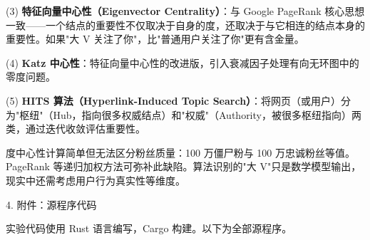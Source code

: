 \noindent\hspace*{2em}(3) \textbf{特征向量中心性（Eigenvector Centrality）}：与 Google PageRank 核心思想一致——一个结点的重要性不仅取决于自身的度，还取决于与它相连的结点本身的重要性。如果"大 V 关注了你"，比"普通用户关注了你"更有含金量。\par
\noindent\hspace*{2em}(4) \textbf{Katz 中心性}：特征向量中心性的改进版，引入衰减因子处理有向无环图中的零度问题。\par
\noindent\hspace*{2em}(5) \textbf{HITS 算法（Hyperlink-Induced Topic Search）}：将网页（或用户）分为"枢纽"（Hub，指向很多权威结点）和"权威"（Authority，被很多枢纽指向）两类，通过迭代收敛评估重要性。\par
\noindent\hspace*{2em}度中心性计算简单但无法区分粉丝质量：100 万僵尸粉与 100 万忠诚粉丝等值。PageRank 等递归加权方法可弥补此缺陷。算法识别的"大 V"只是数学模型输出，现实中还需考虑用户行为真实性等维度。\par
\noindent\hspace*{2em}4. 附件：源程序代码\par
\noindent\hspace*{2em}实验代码使用 Rust 语言编写，Cargo 构建。以下为全部源程序。\par
